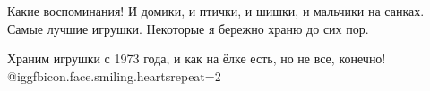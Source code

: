  
 
 
 
 



Какие воспоминания! И домики, и птички, и шишки, и мальчики на санках. Самые
лучшие игрушки. Некоторые я бережно храню до сих пор.


Храним игрушки с 1973 года, и как на ёлке есть, но не все, конечно!
@igg{fbicon.face.smiling.hearts}{repeat=2} 

